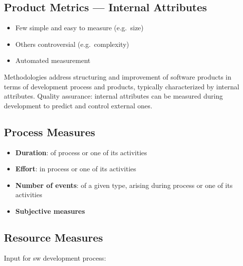 \subsection{Product Metrics — Internal Attributes}

\begin{itemize}
  \item Few simple and easy to measure (e.g.\ size)
  \item Others controversial (e.g.\ complexity)
  \item Automated measurement
\end{itemize}

Methodologies address structuring and improvement of software products in terms of
development process and products, typically characterized by internal attributes.
Quality assurance: internal attributes can be measured during development to predict
and control external ones.

\subsection{Process Measures}

\begin{itemize}
  \item \textbf{Duration}: of process or one of its activities
  \item \textbf{Effort}: in process or one of its activities
  \item \textbf{Number of events}: of a given type, arising during process or one of
        its activities
  \item \textbf{Subjective measures}
\end{itemize}

\subsection{Resource Measures}

Input for sw development process:

